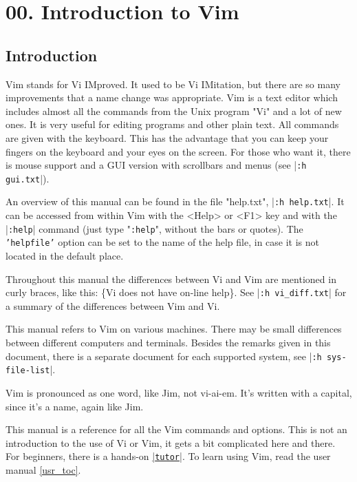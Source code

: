 \section{00. Introduction to Vim}
\label{ref}
\label{reference}
\subsection{Introduction}
\label{intro}
Vim stands for Vi IMproved.
It used to be Vi IMitation, but there are so many improvements that a name change was appropriate.
Vim is a text editor which includes almost all the commands from the Unix program "Vi" and a lot of new ones.
It is very useful for editing programs and other plain text.
All commands are given with the keyboard.
This has the advantage that you can keep your fingers on the keyboard and your eyes on the screen.
For those who want it, there is mouse support and a GUI version with scrollbars and menus (see |\texttt{:h gui.txt}|).

An overview of this manual can be found in the file "help.txt", |\texttt{:h help.txt}|.
It can be accessed from within Vim with the <Help> or <F1> key and with the |\texttt{:help}| command (just type "\texttt{:help}", without the bars or quotes).
The \texttt{'helpfile'} option can be set to the name of the help file, in case it is not located in the default place.

Throughout this manual the differences between Vi and Vim are mentioned in curly braces, like this: \{Vi does not have on-line help\}.
See |\texttt{:h vi\_diff.txt}| for a summary of the differences between Vim and Vi.

This manual refers to Vim on various machines.
There may be small differences between different computers and terminals.
Besides the remarks given in this document, there is a separate document for each supported system, see |\texttt{:h sys-file-list}|.

\label{pronounce}
Vim is pronounced as one word, like Jim, not vi-ai-em.
It's written with a capital, since it's a name, again like Jim.

This manual is a reference for all the Vim commands and options.
This is not an introduction to the use of Vi or Vim, it gets a bit complicated here and there.
For beginners, there is a hands-on \hyperref[tutor]{|\texttt{tutor}|}.
To learn using Vim, read the user manual \ref{usr_toc}.

